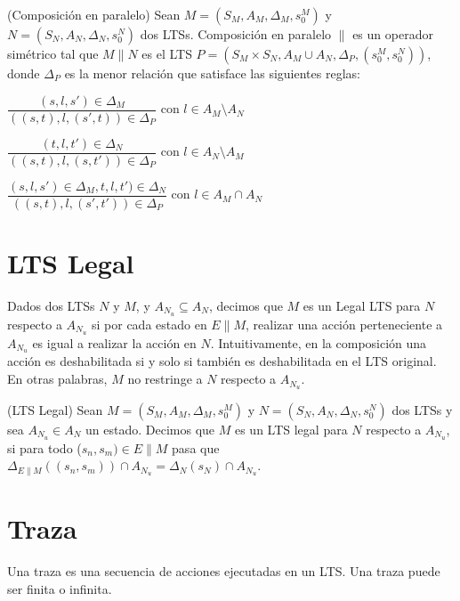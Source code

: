 \begin{definition}{(Composición en paralelo)}
Sean $M = (S_{M}, A_{M}, \Delta_{M}, s_{0}^{M})$ y\\
$N = (S_{N}, A_{N}, \Delta_{N}, s_{0}^{N})$ dos LTSs. Composición en paralelo $\parallel$ es un operador simétrico tal que 
$M \parallel N$ es el LTS $P = (S_{M} \times S_{N}, A_{M} \cup A_{N}, \Delta_{P}, (s_{0}^{M}, s_{0}^{N}))$, donde $\Delta_{P}$ es
la menor relación que satisface las siguientes reglas:

\vspace{\baselineskip}
$\dfrac{(s, l, s') \in \Delta_{M}}{((s, t), l, (s', t)) \in \Delta_{P}}$ con $l \in A_{M} \setminus A_{N}$

\vspace{\baselineskip}
$\dfrac{(t, l, t') \in \Delta_{N}}{((s, t), l, (s, t')) \in \Delta_{P}}$ con $l \in A_{N} \setminus A_{M}$

\vspace{\baselineskip}
$\dfrac{(s, l, s') \in \Delta_{M}, t, l, t') \in \Delta_{N}}{((s, t), l, (s', t')) \in \Delta_{P}}$ con $l \in A_{M} \cap A_{N}$
\end{definition}

\section{LTS Legal}
Dados dos LTSs $N$ y $M$, y $A_{N_{u}} \subseteq A_{N}$, decimos que $M$ es un Legal LTS para $N$ respecto a $A_{N_{u}}$ si por cada
estado en $E\parallel$$M$, realizar una acción perteneciente a $A_{N_{u}}$ es igual a realizar la acción en $N$.
Intuitivamente, en la composición una acción es deshabilitada si y solo si también es deshabilitada en el LTS original.
En otras palabras, $M$ no restringe a $N$ respecto a $A_{N_{u}}$.

\begin{definition}{(LTS Legal)}
Sean $M = (S_{M}, A_{M}, \Delta_{M}, s_{0}^{M})$ y $N = (S_{N}, A_{N}, \Delta_{N}, s_{0}^{N})$ dos LTSs y sea $A_{N_{u}} \in A_{N}$ un estado.
Decimos que $M$ es un LTS legal para $N$ respecto a $A_{N_{u}}$, si para todo ($s_{n}, s_{m}) \in E \parallel M$ pasa que 
$\Delta_{E \parallel M}((s_{n}, s_{m})) \cap A_{N_{u}} = \Delta_{N}(s_{N}) \cap A_{N_{u}}$.
\end{definition}

\section{Traza}
Una traza es una secuencia de acciones ejecutadas en un LTS. Una traza puede ser finita o infinita.

